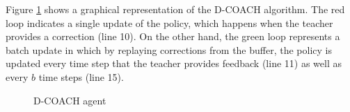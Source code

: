 Figure \ref{fig:DCOACH_diagram} shows a graphical representation of the D-COACH algorithm. The red loop indicates a single update of the policy, which happens when the teacher provides a correction (line 10). On the other hand, the green loop represents a batch update in which by replaying corrections from the buffer, the policy is updated every time step that the teacher provides feedback (line 11) as well as every $b$ time steps (line 15).

\begin{figure}[H]
    \centering
    \caption{D-COACH agent}
    \label{fig:DCOACH_diagram}
\end{figure}







